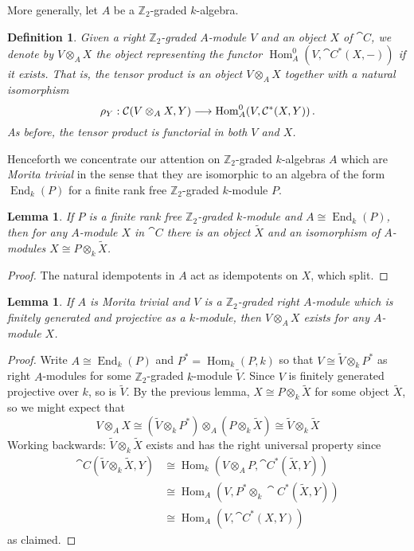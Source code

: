 \documentclass[english,letter paper,12pt,leqno]{article}
\newtheorem{lemma}[theorem]{Lemma}
\theoremstyle{example}
\newtheorem{definition}[theorem]{Definition}
\numberwithin{equation}{section}
\def\Hom{\operatorname{Hom}}
\def\nZ{\mathds{Z}}
\DeclareMathOperator{\End}{End}
\begin{document}
More generally, let $A$ be a $\mathbb{Z}_2$-graded $k$-algebra.

\begin{definition} Given a right $\mathbb{Z}_2$-graded $A$-module $V$ and an object $X$ of $\cat{C}$, we denote by $V \otimes_A X$ the object representing the functor $\Hom^0_A( V, \cat{C}^*(X,-))$ if it exists. That is, the tensor product is an object $V \otimes_A X$ together with a natural isomorphism
\begin{equation}\label{eq:isodefatensor}
\rho_Y: \cat{C}(V \otimes_A X, Y) \lto \Hom^0_A( V, \cat{C}^*(X,Y))\,.
\end{equation}
As before, the tensor product is functorial in both $V$ and $X$.
\end{definition}

Henceforth we concentrate our attention on $\mathbb{Z}_2$-graded $k$-algebras $A$ which are \emph{Morita trivial} in the sense that they are isomorphic to an algebra of the form $\End_k(P)$ for a finite rank free $\mathbb{Z}_2$-graded $k$-module $P$.

\begin{lemma} If $P$ is a finite rank free $\nZ_2$-graded $k$-module and $A \cong \End_k(P)$, then for any $A$-module $X$ in $\cat{C}$ there is an object $\widetilde{X}$ and an isomorphism of $A$-modules $X \cong P \otimes_k \widetilde{X}$.
\end{lemma}
\begin{proof}
The natural idempotents in $A$ act as idempotents on $X$, which split.
\end{proof}

\begin{lemma} If $A$ is Morita trivial and $V$ is a $\mathbb{Z}_2$-graded right $A$-module which is finitely generated and projective as a $k$-module, then $V \otimes_A X$ exists for any $A$-module $X$.
\end{lemma}
\begin{proof}
Write $A \cong \End_k(P)$ and $P^* = \Hom_k(P,k)$ so that $V \cong \widetilde{V} \otimes_k P^*$ as right $A$-modules for some $\mathbb{Z}_2$-graded $k$-module $\widetilde{V}$. Since $V$ is finitely generated projective over $k$, so is $\widetilde{V}$. By the previous lemma, $X \cong P \otimes_k \widetilde{X}$ for some object $\widetilde{X}$, so we might expect that
\[
V \otimes_A X \cong (\widetilde{V} \otimes_k P^*) \otimes_A (P \otimes_k \widetilde{X}) \cong \widetilde{V} \otimes_k \widetilde{X}
\]
Working backwards: $\widetilde{V} \otimes_k \widetilde{X}$ exists and has the right universal property since
\begin{align*}
\cat{C}(\widetilde{V} \otimes_k \widetilde{X}, Y) &\cong \Hom_k( V \otimes_A P, \cat{C}^*(\widetilde{X}, Y))\\
&\cong \Hom_A( V, P^* \otimes_k \cat{C}^*(\widetilde{X}, Y))\\
&\cong \Hom_A( V, \cat{C}^*( X, Y ) )
\end{align*}
as claimed.
\end{proof}
\end{document}
